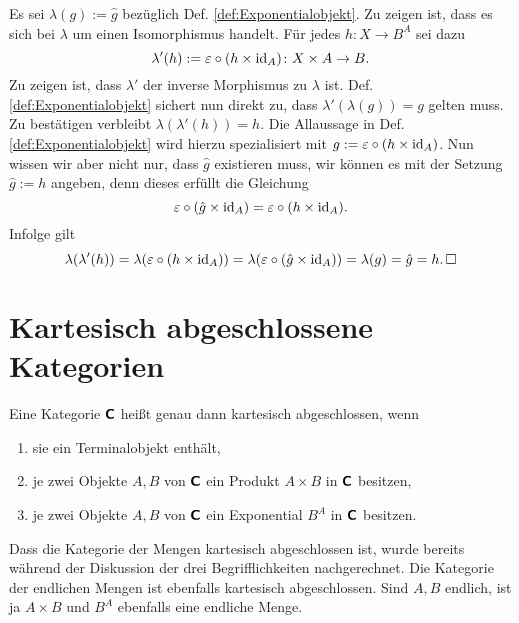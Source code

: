 \noindent{} Es sei $\lambda(g):=\hat g$ bezüglich Def.
\ref{def:Exponentialobjekt}. Zu zeigen ist, dass es sich bei $\lambda$
um einen Isomorphismus handelt. Für jedes $h\colon X\to B^A$ sei dazu
\[\lambda'(h) := \varepsilon\circ (h\times\operatorname{id}_{A})\colon X\times A\to B.\]
Zu zeigen ist, dass $\lambda'$ der inverse Morphismus zu $\lambda$ ist.
Def. \ref{def:Exponentialobjekt} sichert nun direkt zu, dass
$\lambda'(\lambda(g)) = g$ gelten muss. Zu bestätigen verbleibt
$\lambda(\lambda'(h)) = h$. Die Allaussage in Def. \ref{def:Exponentialobjekt}
wird hierzu spezialisiert mit $g:=\varepsilon\circ (h\times\operatorname{id}_A)$.
Nun wissen wir aber nicht nur, dass $\hat g$ existieren muss, wir
können es mit der Setzung $\hat g:=h$ angeben, denn dieses erfüllt die
Gleichung
\[\varepsilon\circ (\hat g\times\operatorname{id}_A) = \varepsilon\circ (h\times\operatorname{id}_A).\]
Infolge gilt
\[\lambda(\lambda'(h)) = \lambda(\varepsilon\circ (h\times\operatorname{id}_A))
= \lambda(\varepsilon\circ (\hat g\times\operatorname{id}_A))
= \lambda(g) = \hat g = h.\,\Box\]

\section{Kartesisch abgeschlossene Kategorien}

\begin{Definition}\newlinefirst
Eine Kategorie $\textsf{\textbf{C}}$ heißt genau dann kartesisch abgeschlossen,
wenn
\begin{enumerate}[nosep]
\item sie ein Terminalobjekt enthält,
\item je zwei Objekte $A,B$ von $\textsf{\textbf{C}}$ ein Produkt
  $A\times B$ in $\textsf{\textbf{C}}$ besitzen,
\item je zwei Objekte $A,B$ von $\textsf{\textbf{C}}$ ein Exponential
  $B^A$ in $\textsf{\textbf{C}}$ besitzen.
\end{enumerate}
\end{Definition}

\noindent
Dass die Kategorie der Mengen kartesisch abgeschlossen ist, wurde
bereits während der Diskussion der drei Begrifflichkeiten
nachgerechnet. Die Kategorie der endlichen Mengen ist ebenfalls
kartesisch abgeschlossen. Sind $A,B$ endlich, ist ja $A\times B$
und $B^A$ ebenfalls eine endliche Menge.


